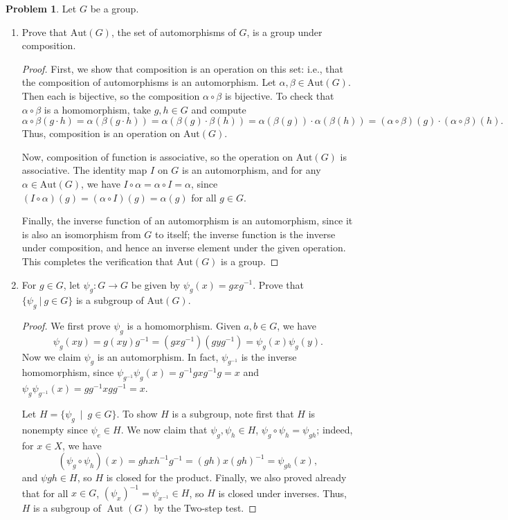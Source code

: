 \documentclass[11pt]{article}
\theoremstyle{definition}
\newtheorem{problem}{Problem}
\begin{document}
\begin{problem} Let $G$ be a group.
\begin{enumerate}[(4.1)]
\item Prove that $\mathrm{Aut}(G)$, the set of automorphisms of $G$, is a group under composition.

\begin{proof} First, we show that composition is an operation on this set: i.e., that the composition of automorphisms is an automorphism. Let $\alpha, \beta \in \mathrm{Aut}(G)$. Then each is bijective, so the composition $\alpha\circ \beta$ is bijective. To check that $\alpha\circ \beta$ is a homomorphism, take $g,h\in G$ and compute
\[ \alpha\circ \beta(g\cdot h) = \alpha (\beta(g\cdot h)) = \alpha(\beta(g) \cdot \beta(h)) = \alpha(\beta(g)) \cdot \alpha(\beta(h)) = (\alpha\circ \beta)(g) \cdot (\alpha\circ \beta)(h).\]
Thus, composition is an operation on $\mathrm{Aut}(G)$.

Now, composition of function is associative, so the operation on $\mathrm{Aut}(G)$ is associative. The identity map $I$ on $G$ is an automorphism, and for any $\alpha \in \mathrm{Aut}(G)$, we have $I\circ \alpha = \alpha\circ I = \alpha$, since $(I\circ \alpha)(g) = (\alpha\circ I)(g) = \alpha(g)$ for all $g\in G$.

Finally, the inverse function of an automorphism is an automorphism, since it is also an isomorphism from $G$ to itself; the inverse function is the inverse under composition, and hence an inverse element under the given operation. This completes the verification that  $\mathrm{Aut}(G)$ is a group.
\end{proof}

\item For $g\in G$, let $\psi_g: G\to G$ be given by $\psi_g(x) = gxg^{-1}$. Prove that $\{ \psi_g \ | \ g\in G\}$ is a subgroup of $\mathrm{Aut}(G)$. 

\begin{proof}
We first prove $\psi_g$ is a homomorphism. Given $a,b\in G$, we have
$$\psi_g(xy)=g(xy)g^{-1}=(gxg^{-1})(gyg^{-1})=\psi_g(x)\psi_g(y).$$ 
Now we claim $\psi_g$ is an automorphism. In fact, $\psi_{g^{-1}}$ is the inverse homomorphism, since $\psi_{g^{-1}}\psi_{g}(x) = g^{-1} g x g^{-1} g = x$ and $\psi_{g}\psi_{g^{-1}}(x) = g g^{-1}  x g g^{-1} = x$.

Let $H=\{\psi_g \ \mid \ g\in G\}$. To show $H$ is a subgroup, note first that $H$ is nonempty since $\psi_e \in H$. We now claim that $\psi_g, \psi_h\in H$, $\psi_g\circ \psi_h=\psi_{gh}$; indeed, for $x\in X$, we have
\[ (\psi_g\circ \psi_h)(x) = g h x h^{-1} g^{-1} = (gh) x (gh)^{-1} = \psi_{gh}(x),\]
and $\psi{gh}\in H$, so $H$ is closed for the product.  Finally, we also proved already that for all $x\in G$,  $(\psi_x)^{-1}=\psi_{x^{-1}}\in H$, so $H$ is closed under inverses.  Thus, $H$ is a subgroup of $\operatorname{Aut}(G)$ by the Two-step test.
\end{proof}
\end{enumerate}
\end{problem}
\end{document}
